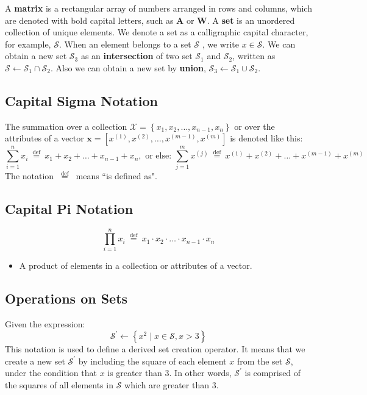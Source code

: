A \textbf{matrix} is a rectangular array of numbers arranged in rows and columns, which are denoted with bold capital letters, such as $\mathbf{A}$ or $\mathbf{W}$.  A \textbf{set} is an unordered collection of unique elements. We denote a set as a calligraphic capital character, for example, \(\mathcal{S}\). When an element belongs to a set \(\mathcal{S}\) , we write $x\in\mathcal{S}$. We can obtain a new set $\mathcal{S}_3$ as an \textbf{intersection} of two set $\mathcal{S}_1$ and $\mathcal{S}_2$, written as $\mathcal{S} \leftarrow\mathcal{S}_{1} \cap \mathcal{S}_{2}$. Also we can obtain a new set by \textbf{union}, $\mathcal{S}_3\leftarrow\mathcal{S}_1\cup\mathcal{S}_2$.

\subsection{Capital Sigma Notation}
The summation over a collection \(\mathcal{X}=\left\{x_{1}, x_{2}, \ldots, x_{n-1}, x_{n}\right\}\) or over the attributes of a vector $\mathbf{x}=\left[x^{(1)}, x^{(2)}, \ldots, x^{(m-1)}, x^{(m)}\right]$ is denoted like this:
\begin{equation*}
	\sum_{i=1}^{n} x_{i} \stackrel{\text { def }}{=} x_{1}+x_{2}+\ldots+x_{n-1}+x_{n}, \text { or else: } \sum_{j=1}^{m} x^{(j)} \stackrel{\text { def }}{=} x^{(1)}+x^{(2)}+\ldots+x^{(m-1)}+x^{(m)}
\end{equation*}
The notation $\stackrel{\text { def }}{=}$ means ``is defined as".

\subsection{Capital Pi Notation}

\begin{equation*}
	\prod_{i=1}^{n} x_{i} \stackrel{\text { def }}{=} x_{1} \cdot x_{2} \cdot \ldots \cdot x_{n-1} \cdot x_{n}
\end{equation*}
\begin{itemize}
	\item A product of elements in a collection or attributes of a vector.
\end{itemize}

\subsection{Operations on Sets}

Given the expression:
\[ \mathcal{S}^{\prime} \leftarrow \left\{x^{2} \mid x \in \mathcal{S}, x > 3\right\} \]
This notation is used to define a derived set creation operator. It means that we create a new set \( \mathcal{S}^{\prime} \) by including the square of each element \( x \) from the set \( \mathcal{S} \), under the condition that \( x \) is greater than 3. In other words, \( \mathcal{S}^{\prime} \) is comprised of the squares of all elements in \( \mathcal{S} \) which are greater than 3.

